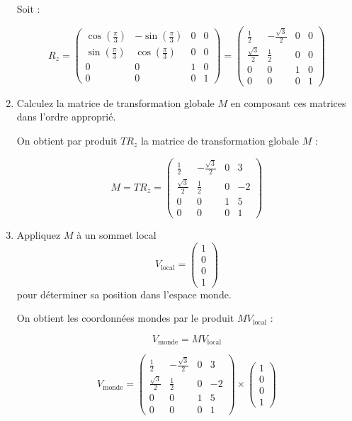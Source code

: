 \documentclass[a4paper,12pt]{article}
\begin{document}
\begin{enumerate}
    Soit :

    \[
    \boxed{
    R_z = 
    \begin{pmatrix}
    \cos(\frac{\pi}{3}) & -\sin(\frac{\pi}{3}) & 0 & 0 \\
    \sin(\frac{\pi}{3}) & \cos(\frac{\pi}{3}) & 0 & 0 \\
    0 & 0 & 1 & 0 \\
    0 & 0 & 0 & 1
    \end{pmatrix} 
    =
    \begin{pmatrix}
    \frac{1}{2} & -\frac{\sqrt{3}}{2} & 0 & 0 \\
    \frac{\sqrt{3}}{2} & \frac{1}{2} & 0 & 0 \\
    0 & 0 & 1 & 0 \\
    0 & 0 & 0 & 1
    \end{pmatrix} 
    }
    \]

    \newpage

  \item Calculez la matrice de transformation globale \(M\) en composant ces matrices dans l'ordre approprié.

    On obtient par produit $T R_z$ la matrice de transformation globale \(M\) :

    \[
    \boxed{
    M = T R_z =
    \begin{pmatrix}
    \frac{1}{2} & -\frac{\sqrt{3}}{2} & 0 & 3 \\
    \frac{\sqrt{3}}{2} & \frac{1}{2} & 0 & -2 \\
    0 & 0 & 1 & 5 \\
    0 & 0 & 0 & 1
    \end{pmatrix}
    } 
    \]


  \item Appliquez \(M\) à un sommet local 
  \[
  V_{\text{local}} = \begin{pmatrix} 1 \\ 0 \\ 0 \\ 1 \end{pmatrix}
  \]
  pour déterminer sa position dans l'espace monde. \newline

    On obtient les coordonnées mondes par le produit $M V_{\text{local}}$ :

    \[
    V_{\text{monde}} = M V_{\text{local}}
    \]

    \[
    V_{\text{monde}} = 
      \begin{pmatrix}
      \frac{1}{2} & -\frac{\sqrt{3}}{2} & 0 & 3 \\
      \frac{\sqrt{3}}{2} & \frac{1}{2} & 0 & -2 \\
      0 & 0 & 1 & 5 \\
      0 & 0 & 0 & 1
      \end{pmatrix} 
      \times
      \begin{pmatrix} 1 \\ 0 \\ 0 \\ 1 \end{pmatrix}
    \]


\end{enumerate}
\end{document}
